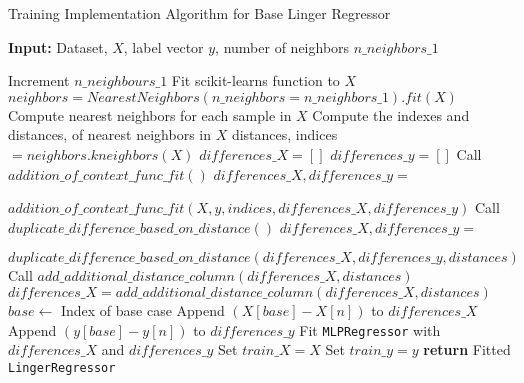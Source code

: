 \documentclass[a4paper, 12pt]{report}
\begin{document}
\begin{algorithm}[H]
    \caption{Training Implementation Algorithm for Base Linger Regressor}
    \textbf{Input:} Dataset, $X$, label vector $y$, number of neighbors $n\_neighbors\_1$
    \label{alg:base_linger_regressor_train_implementation}
    \begin{algorithmic}[1]
            \State Increment $n\_neighbours\_1$
            \Comment Fit scikit-learns  function to $X$
            \State $neighbors = NearestNeighbors(n\_neighbors=n\_neighbors\_1).fit(X)$
            \State Compute nearest neighbors for each sample in $X$
            \State Compute the indexes and distances, of nearest neighbors in $X$
            \State distances, indices $= neighbors.kneighbors(X)$
            \State $differences\_X = []$ 
            \State $differences\_y = []$
                \State Call $addition\_of\_context\_func\_fit()$
                \State $differences\_X, differences\_y =$ \par $addition\_of\_context\_func\_fit(X, y, indices, differences\_X, differences\_y)$
                \State Call $duplicate\_difference\_based\_on\_distance()$
                \State $differences\_X, differences\_y =$ \par $duplicate\_difference\_based\_on\_distance(differences\_X, differences\_y, distances)$
                \State Call $add\_additional\_distance\_column(differences\_X, distances)$
                \State $differences\_X = add\_additional\_distance\_column(differences\_X, distances)$
            \Else
                    \State $base \gets$ Index of base case
                        \State Append $(X[base] - X[n])$ to $differences\_X$
                        \State Append $(y[base] - y[n])$ to $differences\_y$
                    \EndFor
                \EndFor  
            \EndIf
            \State Fit \texttt{MLPRegressor} with $differences\_X$ and $differences\_y$
            \State Set $train\_X = X$
            \State Set $train\_y = y$
            \State \textbf{return} Fitted \texttt{LingerRegressor}
        \EndFunction
    \end{algorithmic}
\end{algorithm}
\end{document}
